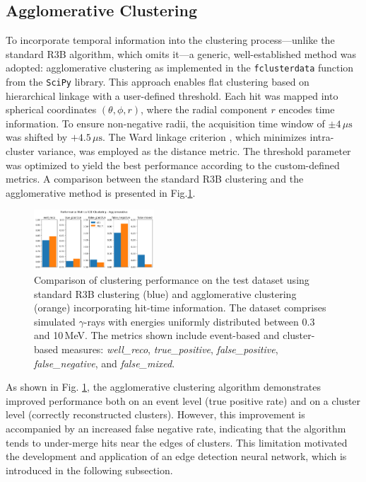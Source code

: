 \documentclass[final,5p,times,twocolumn]{elsarticle}
\begin{document}
\subsection{Agglomerative Clustering}\label{s_sec:agglo}
To incorporate temporal information into the clustering process---unlike the standard R3B algorithm, which omits it---a generic, well-established method was adopted: agglomerative clustering as implemented in the \texttt{fclusterdata} function from the \texttt{SciPy} library. This approach enables flat clustering based on hierarchical linkage with a user-defined threshold.\newline
Each hit was mapped into spherical coordinates \((\theta, \phi, r)\), where the radial component \(r\) encodes time information. To ensure non-negative radii, the acquisition time window of \(\pm 4\,\mu\mathrm{s}\) was shifted by \(+4.5\,\mu\mathrm{s}\). The Ward linkage criterion \cite{nielsen2016hierarchical}, which minimizes intra-cluster variance, was employed as the distance metric.\newline
The threshold parameter was optimized to yield the best performance according to the custom-defined metrics. A comparison between the standard R3B clustering and the agglomerative method is presented in Fig.\ref{fig:r3b_agglo_metrics}.
\begin{figure}[!htb]
	\centering 
	\includegraphics[width=0.4\textwidth]{r3b_vs_agglo_metrics.png}	
	\caption{Comparison of clustering performance on the test dataset using standard R3B clustering (blue) and agglomerative clustering (orange) incorporating hit-time information. The dataset comprises simulated $\gamma$-rays with energies uniformly distributed between 0.3 and 10\,MeV. The metrics shown include event-based and cluster-based measures: \textit{well\_reco}, \textit{true\_positive}, \textit{false\_positive}, \textit{false\_negative}, and \textit{false\_mixed}.} 
	\label{fig:r3b_agglo_metrics}%
\end{figure}
As shown in Fig. \ref{fig:r3b_agglo_metrics}, the agglomerative clustering algorithm demonstrates improved performance both on an event level (true positive rate) and on a cluster level (correctly reconstructed clusters). However, this improvement is accompanied by an increased false negative rate, indicating that the algorithm tends to under-merge hits near the edges of clusters. This limitation motivated the development and application of an edge detection neural network, which is introduced in the following subsection.
\end{document}
